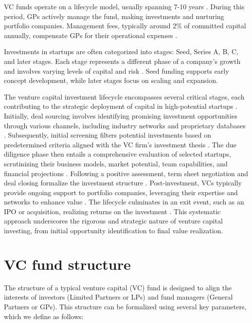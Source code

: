 \documentclass[a4paper, oneside]{discothesis}
\begin{document}
VC funds operate on a lifecycle model, usually spanning 7-10 years \cite{gompers2004venture}. During this period, GPs actively manage the fund, making investments and nurturing portfolio companies. Management fees, typically around 2\% of committed capital annually, compensate GPs for their operational expenses \cite{gompers2016structure}.

Investments in startups are often categorized into stages: Seed, Series A, B, C, and later stages. Each stage represents a different phase of a company's growth and involves varying levels of capital and risk \cite{hellmann2002venture}. Seed funding supports early concept development, while later stages focus on scaling and expansion.

The venture capital investment lifecycle encompasses several critical stages, each contributing to the strategic deployment of capital in high-potential startups \cite{gompers2004venture}. Initially, deal sourcing involves identifying promising investment opportunities through various channels, including industry networks and proprietary databases \cite{sorenson2001syndication}. Subsequently, initial screening filters potential investments based on predetermined criteria aligned with the VC firm's investment thesis \cite{petty1994harvesting}. The due diligence phase then entails a comprehensive evaluation of selected startups, scrutinizing their business models, market potential, team capabilities, and financial projections \cite{fried2003venture}. Following a positive assessment, term sheet negotiation and deal closing formalize the investment structure \cite{kaplan2003financial, cumming2006contracts}. Post-investment, VCs typically provide ongoing support to portfolio companies, leveraging their expertise and networks to enhance value \cite{sapienza1996venture}. The lifecycle culminates in an exit event, such as an IPO or acquisition, realizing returns on the investment \cite{cumming2008preplanned}. This systematic approach underscores the rigorous and strategic nature of venture capital investing, from initial opportunity identification to final value realization.

\section{VC fund structure}


The structure of a typical venture capital (VC) fund is designed to align the interests of investors (Limited Partners or LPs) and fund managers (General Partners or GPs). This structure can be formalized using several key parameters, which we define as follows:
\end{document}
